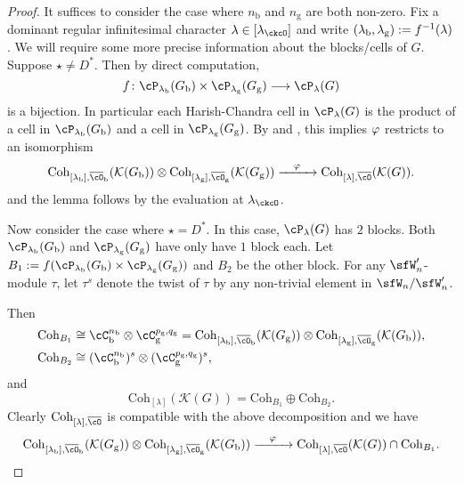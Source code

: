 \documentclass[12pt,a4paper]{amsart}
\newcommand{\CK}{{\mathcal {K}}}
\numberwithin{equation}{section}
\theoremstyle{remark}
\def\lamck{\lambda_\ckcO}
\def\nbb{n_{\mathrm b}}
\def\ngg{n_{\mathrm g}}
\def\Coh{\mathrm{Coh}}
\begin{document}
\begin{proof}
  It suffices to consider the case where $\nbb$ and $\ngg$ are both non-zero.
  Fix a dominant regular infinitesimal character $\lambda\in [\lamck]$ and write
  $(\lambda_{\mathrm b},\lambda_{\mathrm g}):=f^{-1}(\lambda)$. We will require some more
  precise information about the blocks/cells of $G$. Suppose $\star \neq D^{*}$.
  Then by direct computation, 
  \[
    \ff \colon \cP_{\lambda_{\mathrm b}}(G_{\mathrm b})\times \cP_{\lambda_{\mathrm g}}(G_{\mathrm g}) \longrightarrow \cP_{\lambda}(G)
  \]
  is a bijection. In particular each Harish-Chandra cell in $\cP_{\lambda}(G)$
  is the product of a cell in $\cP_{\lambda_{\mathrm b}}(G_{\mathrm b})$ and a cell in
  $\cP_{\lambda_{\mathrm g}}(G_{\mathrm g})$. By  and , this implies $\varphi$
  restricts to an isomorphism
  \[
    \Coh_{[\lambda_{\mathrm b}],\bcO_{\mathrm b}}(\CK(G_{\mathrm b}))\otimes \Coh_{[\lambda_{\mathrm g}],\bcO_{\mathrm g}}(\CK(G_{\mathrm g})) \xrightarrow{\ \ \ \ffcoh\ \ \ } \Coh_{[\lambda],\bcO}(\CK(G)).
  \]
  and the lemma follows by the evaluation at $\lamck$.

  Now consider the case where $\star = D^{*}$. In this case, $\cP_{\lambda}(G)$
  has $2$ blocks. Both $\cP_{\lambda_{\mathrm b}}(G_{\mathrm b})$ and
  $\cP_{\lambda_{\mathrm g}}(G_{\mathrm g})$ have only have $1$ block each. Let
  $B_{1} := \ff(\cP_{\lambda_{\mathrm b}}(G_{\mathrm b})\times \cP_{\lambda_{\mathrm g}}(G_{\mathrm g}))$ and
  $B_{2}$ be the other block. For any $\sfW'_{n}$-module $\tau$, let $\tau^{s}$
  denote the twist of $\tau$ by any non-trivial element in $\sfW_{n}/\sfW'_{n}$.

  Then \[
    \begin{split}
      \Coh_{B_{1}} &\cong \cC_{\mathrm b}^{\nbb}\otimes \cC_{\mathrm g}^{p_{\mathrm g},q_{\mathrm g}} = \Coh_{[\lambda_{\mathrm b}],\bcO_{\mathrm b}}(\CK(G_{\mathrm g}))\otimes \Coh_{[\lambda_{\mathrm g}],\bcO_{\mathrm g}}(\CK(G_{\mathrm b})),\\
      \Coh_{B_{2}} &\cong (\cC_{\mathrm b}^{\nbb})^{s}\otimes (\cC_{\mathrm g}^{p_{\mathrm g},q_{\mathrm g}})^{s},
    \end{split}
  \]
   and
  \[
    \Coh_{[\lambda]}(\CK(G)) = \Coh_{B_{1}}\oplus \Coh_{B_{2}}.
  \]
  Clearly $\Coh_{[\lambda], \bcO}$ is compatible with the above decomposition
  and we have
  \[
    \Coh_{[\lambda_{\mathrm b}],\bcO_{\mathrm b}}(\CK(G_{\mathrm g}))\otimes \Coh_{[\lambda_{\mathrm g}],\bcO_{\mathrm g}}(\CK(G_{\mathrm b})) \xrightarrow{\ \ \ \ffcoh\ \ \ } \Coh_{[\lambda],\bcO}(\CK(G))\cap \Coh_{B_{1}}.
  \]


\end{proof}
\end{document}
